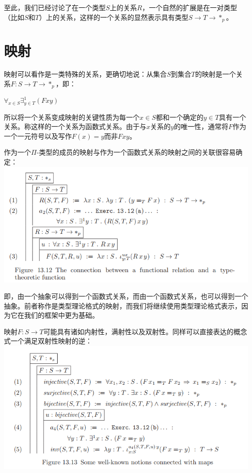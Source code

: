 \documentclass[UTF8]{article}
\begin{document}
		至此，我们已经讨论了在一个类型$S$上的关系$R$，一个自然的扩展是在一对类型（比如$S$和$T$）上的关系，这样的一个关系的显然表示具有类型$S\rightarrow T\rightarrow*_p$。
		
	\section{映射}
	\noindent
	映射可以看作是一类特殊的关系，更确切地说：从集合$S$到集合$T$的映射是一个关系$F:S\rightarrow T\rightarrow*_p$，即：
	
		$\forall_{x\in S}\exists^1_{y\in T}(Fxy)$
		
		所以将一个关系变成映射的关键性质为每一个$x\in S$都和一个确定的$y\in T$具有一个关系。称这样的一个关系为函数式关系。由于与$x$关系的$y$的唯一性，通常将$F$作为一个一元符号以及写作$F(x)=y$而非$Fxy$。
		
		作为一个$\Pi$-类型的成员的映射与作为一个函数式关系的映射之间的关联很容易确定：\\
		\includegraphics[width=0.93\linewidth]{"../imgs/13-12.png"}
		
		即，由一个抽象可以得到一个函数式关系，而由一个函数式关系，也可以得到一个抽象。前者称作是类型理论格式的映射，而我们将继续使用类型理论格式表示，因为它在我们的框架中更为基础。
		
		映射$F:S\rightarrow T$可能具有诸如内射性，满射性以及双射性。同样可以直接表达的概念式一个满足双射性映射的逆：\\
		\includegraphics[width=0.93\linewidth]{"../imgs/13-13.png"}
		
\end{document}
